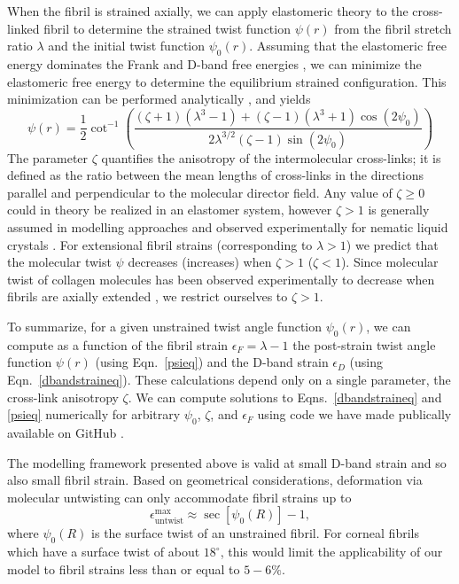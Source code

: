 \documentclass[preprint,12pt]{elsarticle}
\begin{document}
When the fibril is strained axially, we can apply elastomeric theory \cite{Warner:1996} to the cross-linked fibril to determine the strained twist function $\psi(r)$ from  the fibril stretch ratio $\lambda$ and the initial twist function $\psi_0(r)$. Assuming that the elastomeric free energy dominates the Frank and D-band free energies \cite{Leighton:2021}, we can minimize the elastomeric free energy to determine the equilibrium strained configuration. This minimization can be performed analytically \cite{Leighton:2021b}, and yields
\begin{equation}\label{psieq}
    \psi(r) = \frac{1}{2}\cot^{-1}\left( \frac{ (\zeta+1)(\lambda^3-1) + (\zeta-1)(\lambda^3+1)\cos(2\psi_0)}{2\lambda^{3/2}(\zeta-1)\sin(2\psi_0)} \right)
\end{equation}
The parameter $\zeta$ quantifies the anisotropy of the intermolecular cross-links; it is defined as the ratio between the mean lengths of cross-links in the directions parallel and perpendicular to the molecular director field. %
Any value of $\zeta\geq0$ could in theory be realized in an elastomer system, however $\zeta>1$ is generally assumed in modelling approaches \cite{Warner:1996,Warner:2000} and observed experimentally for nematic liquid crystals \cite{DAllest:1988,Kundler:1998}. For extensional fibril strains (corresponding to $\lambda>1$) we predict that the molecular twist $\psi$ decreases (increases) when $\zeta>1$ ($\zeta<1$). Since molecular twist of collagen molecules has been observed experimentally to decrease when fibrils are axially extended \cite{Bell:2018}, we restrict ourselves to $\zeta>1$. 

To summarize, for a given unstrained twist angle function $\psi_0(r)$, we can compute as a function of the fibril strain $\epsilon_F = \lambda-1$ the post-strain twist angle function $\psi(r)$ (using Eqn.~\ref{psieq}) and the D-band strain $\epsilon_D$ (using Eqn.~\ref{dbandstraineq}). These calculations depend only on a single parameter, the cross-link anisotropy $\zeta$. We can compute solutions to Eqns.~\ref{dbandstraineq} and \ref{psieq} numerically for arbitrary $\psi_0$, $\zeta$, and $\epsilon_F$ using code we have made publically available on GitHub \cite{github}. 

The modelling framework presented above is valid at small D-band strain and so also small fibril strain. Based on geometrical considerations, deformation via molecular untwisting can only accommodate fibril strains up to  
\begin{equation} \label{e_untwist_max}
\epsilon_\mathrm{untwist}^\mathrm{max} \approx \sec\left[\psi_0(R)\right]-1,
\end{equation}
where $\psi_0(R)$ is the surface twist of an unstrained fibril. For corneal fibrils which have a surface twist of about $18^\circ$, this would limit the applicability of our model to fibril strains less than or equal to $5-6\%$. 
\end{document}
